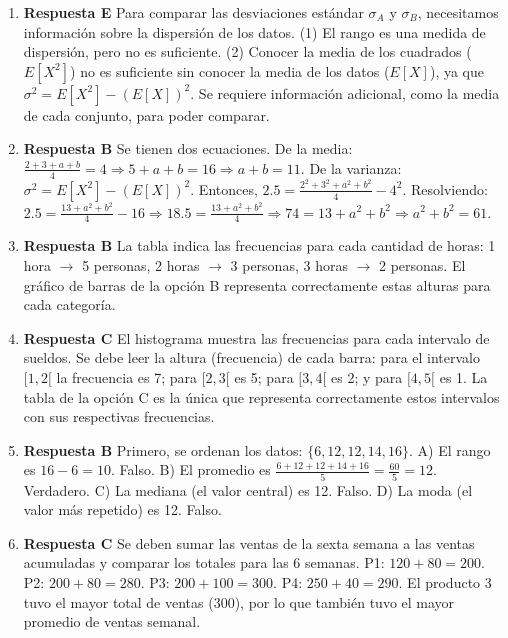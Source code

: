 \documentclass[11pt]{article}
\begin{document}
\begin{enumerate}
    \item \textbf{Respuesta E} Para comparar las desviaciones estándar $\sigma_A$ y $\sigma_B$, necesitamos información sobre la dispersión de los datos. (1) El rango es una medida de dispersión, pero no es suficiente. (2) Conocer la media de los cuadrados ($E[X^2]$) no es suficiente sin conocer la media de los datos ($E[X]$), ya que $\sigma^2 = E[X^2] - (E[X])^2$. Se requiere información adicional, como la media de cada conjunto, para poder comparar. %

    \item \textbf{Respuesta B} Se tienen dos ecuaciones. De la media: $\frac{2+3+a+b}{4} = 4 \Rightarrow 5+a+b = 16 \Rightarrow a+b=11$. De la varianza: $\sigma^2 = E[X^2] - (E[X])^2$. Entonces, $2.5 = \frac{2^2+3^2+a^2+b^2}{4} - 4^2$. Resolviendo: $2.5 = \frac{13+a^2+b^2}{4} - 16 \Rightarrow 18.5 = \frac{13+a^2+b^2}{4} \Rightarrow 74 = 13+a^2+b^2 \Rightarrow a^2+b^2 = 61$. %

    \item \textbf{Respuesta B} La tabla indica las frecuencias para cada cantidad de horas: 1 hora $\to$ 5 personas, 2 horas $\to$ 3 personas, 3 horas $\to$ 2 personas. El gráfico de barras de la opción B representa correctamente estas alturas para cada categoría. %

    \item \textbf{Respuesta C} El histograma muestra las frecuencias para cada intervalo de sueldos. Se debe leer la altura (frecuencia) de cada barra: para el intervalo $[1, 2[$ la frecuencia es 7; para $[2, 3[$ es 5; para $[3, 4[$ es 2; y para $[4, 5[$ es 1. La tabla de la opción C es la única que representa correctamente estos intervalos con sus respectivas frecuencias. %

    \item \textbf{Respuesta B} Primero, se ordenan los datos: $\{6, 12, 12, 14, 16\}$. A) El rango es $16-6=10$. Falso. B) El promedio es $\frac{6+12+12+14+16}{5} = \frac{60}{5} = 12$. Verdadero. C) La mediana (el valor central) es 12. Falso. D) La moda (el valor más repetido) es 12. Falso. %

    \item \textbf{Respuesta C} Se deben sumar las ventas de la sexta semana a las ventas acumuladas y comparar los totales para las 6 semanas. P1: $120+80=200$. P2: $200+80=280$. P3: $200+100=300$. P4: $250+40=290$. El producto 3 tuvo el mayor total de ventas (300), por lo que también tuvo el mayor promedio de ventas semanal. %


\end{enumerate}
\end{document}
